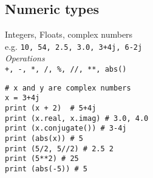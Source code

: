 \subsection{Numeric types}
Integers, Floats, complex numbers \\
e.g. \texttt{10, 54, 2.5, 3.0, 3+4j, 6-2j} \\
\textit{Operations} \\
\texttt{+, -, *, /, \%, //, **, abs()}\\

\begin{lstlisting}
# x and y are complex numbers
x = 3+4j
print (x + 2)  # 5+4j
print (x.real, x.imag) # 3.0, 4.0
print (x.conjugate()) # 3-4j
print (abs(x)) # 5
print (5/2, 5//2) # 2.5 2
print (5**2) # 25
print (abs(-5)) # 5
\end{lstlisting}
